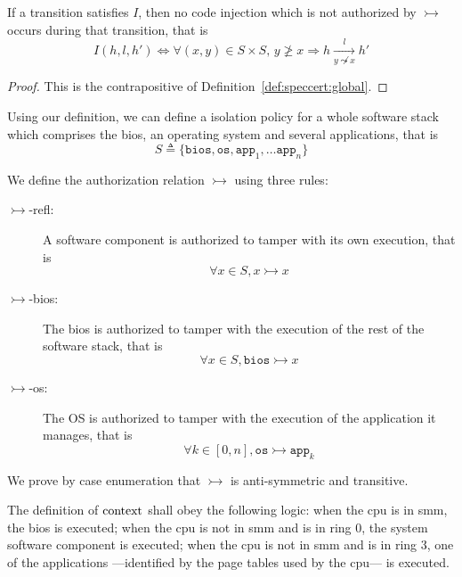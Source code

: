 \begin{corollary}
  If a transition satisfies $I$, then no code injection which is not authorized
  by $\rightarrowtail$ occurs during that transition, that is
  \[
    I(h, l, h') \iff \forall (x, y) \in S \times S \text{, } y \not\ge x
    \Rightarrow h \xrightarrow[y \not\leadsto x]{l} h'
  \]

  \begin{proof}
    This is the contrapositive of Definition~\ref{def:speccert:global}.
  \end{proof}
\end{corollary}

\begin{example}
  \label{example:speccert2:isolation}
  Using our definition, we can define a isolation policy for a whole software
  stack which comprises the \ac{bios}, an operating system and several
  applications, that is
  \[
    S \triangleq \{ \mathtt{bios}, \mathtt{os}, \mathtt{app}_1, \dots
    \mathtt{app}_n \}
  \]

  We define the authorization relation $\rightarrowtail$ using three rules:
  \begin{description}
  \item [\(\rightarrowtail\)-refl:] A software component is authorized to tamper
    with its own execution, that is
    \[ \forall x \in S, x \rightarrowtail x \]
  \item [\(\rightarrowtail\)-bios:] The \ac{bios} is authorized to tamper with
    the execution of the rest of the software stack, that is
    \[ \forall x \in S, \mathtt{bios} \rightarrowtail x \]
  \item [\(\rightarrowtail\)-os:] The OS is authorized to tamper with the
    execution of the application it manages, that is
    \[ \forall k \in [0, n], \mathtt{os} \rightarrowtail \mathtt{app}_k \]
  \end{description}

  We prove by case enumeration that $\rightarrowtail$ is anti-symmetric and
  transitive.

  The definition of $\mathrm{context}$ shall obey the following logic: when the
  \ac{cpu} is in \ac{smm}, the \ac{bios} is executed; when the \ac{cpu} is not
  in \ac{smm} and is in ring 0, the system software component is executed; when
  the \ac{cpu} is not in \ac{smm} and is in ring 3, one of the applications
  ---identified by the page tables used by the \ac{cpu}--- is executed.
\end{example}

